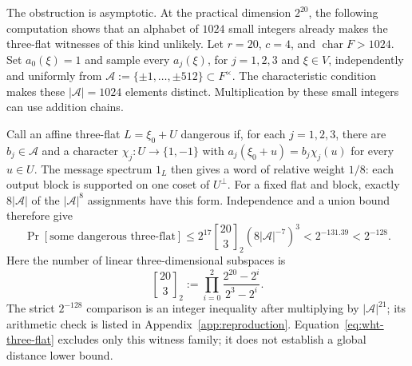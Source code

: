 The obstruction is asymptotic.  At the practical dimension $2^{20}$, the
following computation shows that an alphabet of $1024$ small integers already
makes the three-flat witnesses of this kind unlikely.  Let $r=20$, $c=4$, and
$\operatorname{char}F>1024$. Set $a_0(\xi)=1$ and sample every
$a_j(\xi)$, for $j=1,2,3$ and $\xi\in V$, independently and uniformly from
$\mathcal A:=\{\pm1,\ldots,\pm512\}\subset F^\times$.
The characteristic condition makes these $|\mathcal A|=1024$ elements
distinct.  Multiplication by these small integers can use addition chains.

Call an affine three-flat $L=\xi_0+U$ dangerous if, for each $j=1,2,3$,
there are $b_j\in\mathcal A$ and a character
$\chi_j:U\to\{1,-1\}$ with
$a_j(\xi_0+u)=b_j\chi_j(u)$ for every $u\in U$.
The message spectrum $1_L$ then gives a word of relative weight $1/8$:
each output block is supported on one coset of $U^\perp$.
For a fixed flat and block, exactly $8|\mathcal A|$ of the $|\mathcal A|^8$
assignments have this form. Independence and a union bound therefore give
\begin{equation}\label{eq:wht-three-flat}
 \Pr[\text{some dangerous three-flat}]
 \le 2^{17}\genfrac{[}{]}{0pt}{}{20}{3}_2(8|\mathcal A|^{-7})^3
 <2^{-131.39}<2^{-128}.
\end{equation}
Here the number of linear three-dimensional subspaces is
\[
 \genfrac{[}{]}{0pt}{}{20}{3}_2:=\prod_{i=0}^{2}\frac{2^{20}-2^i}{2^3-2^i}.
\]
The strict $2^{-128}$ comparison is an integer inequality after multiplying
by $|\mathcal A|^{21}$; its arithmetic check is listed in
Appendix~\ref{app:reproduction}.
Equation~\eqref{eq:wht-three-flat} excludes only this witness family; it does
not establish a global distance lower bound.
